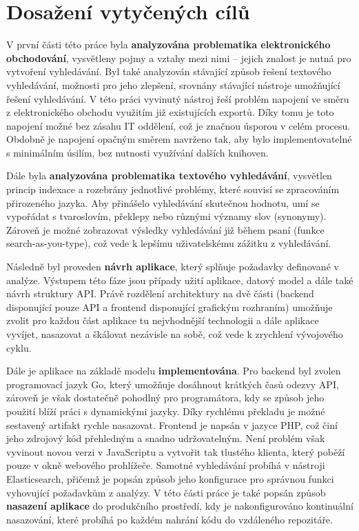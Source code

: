 \documentclass[FM,DP]{tulthesis}
\begin{document}
\section{Dosažení vytyčených cílů}

V první části této práce byla \textbf{analyzována problematika elektronického obchodování}, vysvětleny pojmy
a vztahy mezi nimi -- jejich znalost je nutná pro vytvoření vyhledávání. Byl také analyzován stávající
způsob řešení textového vyhledávání, možnosti pro jeho zlepšení, srovnány stávající nástroje
umožňující řešení vyhledávání. V této práci vyvinutý nástroj řeší problém napojení ve směru
z elektronického obchodu využitím již existujících exportů. Díky tomu je toto napojení možné
bez zásahu IT oddělení, což je značnou úsporou v celém procesu. Obdobně je napojení opačným směrem navrženo 
tak, aby bylo implementovatelné s minimálním úsilím, bez nutnosti využívání dalších knihoven.

Dále byla \textbf{analyzována problematika textového vyhledávání}, vysvětlen princip indexace a rozebrány
jednotlivé problémy, které souvisí se zpracováním přirozeného jazyka. Aby přinášelo vyhledávání
skutečnou hodnotu, umí se vypořádat s tvaroslovím, překlepy nebo různými významy slov (synonymy).
Zároveň je možné zobrazovat výsledky vyhledávání již během psaní (funkce search-as-you-type), což
vede k lepšímu uživatelskému zážitku z vyhledávání.

Následně byl proveden \textbf{návrh aplikace}, který splňuje požadavky definované v analýze. Výstupem této
fáze jsou případy užití aplikace, datový model a dále také návrh struktury API. Právě rozdělení 
architektury na dvě části (backend disponující pouze API a frontend disponující grafickým rozhraním)
umožňuje zvolit pro každou část aplikace tu nejvhodnější technologii a dále aplikace vyvíjet, 
nasazovat a škálovat nezávisle na sobě, což vede k zrychlení vývojového cyklu.

Dále je aplikace na základě modelu \textbf{implementována}. Pro backend byl zvolen programovací jazyk
Go, který umožňuje dosáhnout krátkých časů odezvy API, zároveň je však dostatečně pohodlný
pro programátora, kdy se způsob jeho použití blíží práci s dynamickými jazyky. Díky rychlému
překladu je možné sestavený artifakt rychle nasazovat. Frontend je napsán v jazyce PHP, což
činí jeho zdrojový kód přehledným a snadno udržovatelným. Není problém však vyvinout novou verzi
v JavaScriptu a vytvořit tak tlustého klienta, který poběží pouze v okně webového prohlížeče.
Samotné vyhledávání probíhá v nástroji Elasticsearch, přičemž je popsán způsob jeho konfigurace
pro správnou funkci vyhovující požadavkům z analýzy. V této části práce je také popsán
způsob \textbf{nasazení aplikace} do produkčního prostředí, kdy je nakonfigurováno kontinuální
nasazování, které probíhá po každém nahrání kódu do vzdáleného repozitáře.
\end{document}

